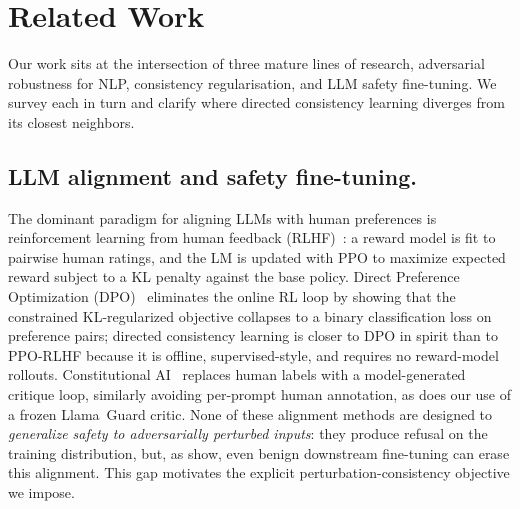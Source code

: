\documentclass{article}
\begin{document}
\section{Related Work}
\label{sec:related-work}
Our work sits at the intersection of three mature lines of research, adversarial robustness for NLP, consistency regularisation, and LLM safety fine-tuning.
We survey each in turn and clarify where directed consistency learning diverges from its closest neighbors.

\subsection{LLM alignment and safety fine-tuning.}
\label{sec:llm-alignmnet}
The dominant paradigm for aligning LLMs with human preferences is reinforcement learning from human feedback (RLHF)~\cite{christiano2017rl,ouyang2022instructgpt}: a reward model is fit to pairwise human ratings, and the LM is updated with PPO to maximize expected reward subject to a KL penalty against the base policy. Direct Preference Optimization (DPO)~\cite{rafailov2023dpo} eliminates the online RL loop by showing that the constrained KL-regularized objective collapses to a binary classification loss on preference pairs; directed consistency learning is closer to DPO in spirit than to PPO-RLHF because it is offline, supervised-style, and requires no reward-model rollouts. Constitutional AI~\cite{bai2022constitutional} replaces human labels with a model-generated critique loop, similarly avoiding per-prompt human annotation, as does our use of a frozen Llama~Guard critic. None of these alignment methods are designed to \emph{generalize safety to adversarially perturbed inputs}: they produce refusal on the training distribution, but, as \citet{qi2024finetuning} show, even benign downstream fine-tuning can erase this alignment. This gap motivates the explicit perturbation-consistency objective we impose.
\end{document}
